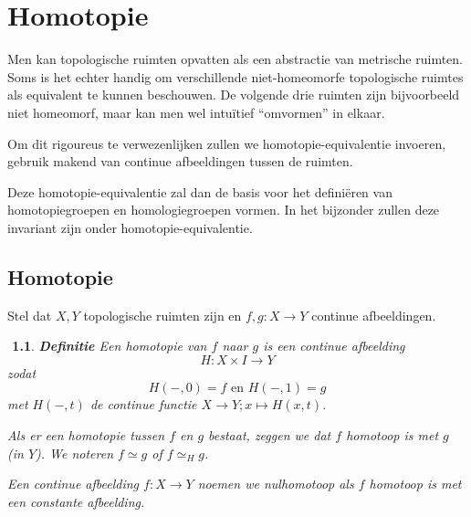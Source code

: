 \documentclass[12pt]{book}
\newtheorem{dfh}[stelh]{$\!\!$}
\newenvironment{df}{\begin{dfh} \em {\bf Definitie }}{\end{dfh}}
\begin{document}
\chapter{Homotopie}

Men kan topologische ruimten opvatten als een abstractie van metrische ruimten. Soms is het echter handig om verschillende niet-homeomorfe topologische ruimtes als equivalent te kunnen beschouwen. De volgende drie ruimten zijn bijvoorbeeld niet homeomorf, maar kan men wel intu\"itief ``omvormen'' in elkaar.

\begin{center}
\end{center}



Om dit rigoureus te  verwezenlijken zullen we homotopie-equivalentie invoeren, gebruik makend van continue afbeeldingen tussen de ruimten.


Deze homotopie-equivalentie zal dan de basis voor het defini\"eren van homotopiegroepen en homologiegroepen  vormen. In het bijzonder zullen deze invariant zijn onder homotopie-equivalentie.

\section{Homotopie}
Stel dat $X,Y$ topologische ruimten zijn en
$f,g:X\to Y$ continue afbeeldingen.

\begin{df}
Een  {\em homotopie} van $f$ naar $g$ is een continue afbeelding
$$H:X\times I \to Y$$
zodat
$$H(-,0)=f \mbox{ en } H(-,1)=g$$
met $H(-, t)$ de continue functie $X\to Y; x \mapsto H(x,t)$.

Als er een homotopie tussen $f$ en $g$ bestaat, zeggen we dat $f$ {\em homotoop} is met $g$ (in $Y$). We
noteren $f\simeq g$ of $f\simeq_{H} g$.

Een continue afbeelding $f:X\to Y$ noemen we {\em nulhomotoop} als $f$ homotoop is met een constante afbeelding.
\end{df}
\end{document}
